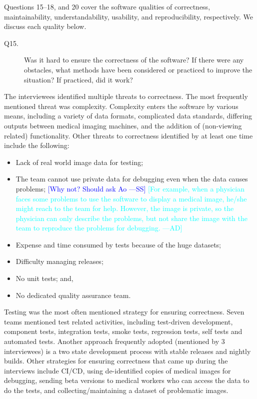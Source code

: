 \documentclass[final, 3p, times, authoryear]{elsarticle}
\newcommand{\authornote}[3]{\textcolor{#1}{[#3 ---#2]}}
\newcommand{\authornote}[3]{}
\newcommand{\wss}[1]{\authornote{blue}{SS}{#1}} %
\newcommand{\ad}[1]{\authornote{cyan}{AD}{#1}} %
\begin{document}
Questions 15--18, and 20 cover the software qualities of correctness,
maintainability, understandability, usability, and reproducibility,
respectively. We discuss each quality below.

\begin{description}
\item[Q15.] Was it hard to ensure the correctness of the software? If there were
any obstacles, what methods have been considered or practiced to improve the
situation? If practiced, did it work?
\end{description}

The interviewees identified multiple threats to correctness.  The most
frequently mentioned threat was complexity.  Complexity enters the software by
various means, including a variety of data formats, complicated data standards,
differing outputs between medical imaging machines, and the addition of
(non-viewing related) functionality.  Other threats to correctness identified by at least one time
include the following:
\begin{itemize}
\item Lack of real world image data for testing;
\item The team cannot use private data for debugging even when the data causes
problems; \wss{Why not?  Should ask Ao} \ad{For example, when a physician faces
some problems to use the software to display a medical image, he/she might reach
to the team for help. However, the image is private, so the physician can only
describe the problems, but not share the image with the team to reproduce the
problems for debugging.}
\item Expense and time consumed by tests because of the huge datasets;
\item Difficulty managing releases;
\item No unit tests; and,
\item No dedicated quality assurance team.
\end{itemize}

Testing was the most often mentioned strategy for ensuring correctness.  Seven
teams mentioned test related activities, including test-driven development,
component tests, integration tests, smoke tests, regression tests, self tests
and automated tests.  Another approach frequently adopted (mentioned by 3
interviewees) is a two state development process with stable releases and
nightly builds.  Other strategies for ensuring correctness that came up during
the interviews include CI/CD, using de-identified copies of medical images for
debugging, sending beta versions to medical workers who can access the data to
do the tests, and collecting/maintaining a dataset of problematic images.
\end{document}
